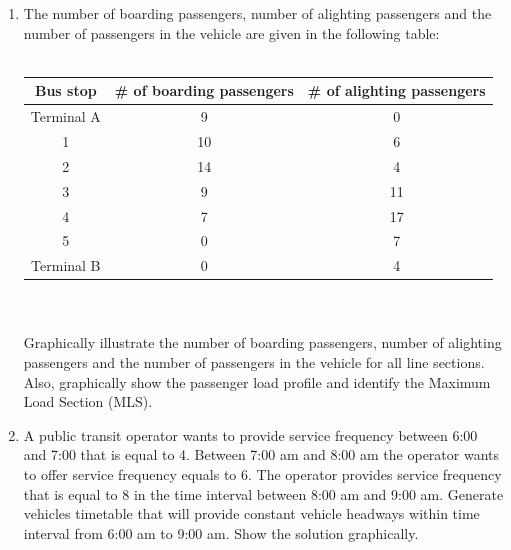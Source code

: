 \begin{enumerate}
\begin{center}
	\end{center}
	\item The number of boarding passengers, number of alighting passengers and the number of passengers in the vehicle are given in the following table:\\\\
	\begin{tabular}{c | c | c}
		\textbf{Bus stop} & \textbf{\# of boarding passengers} & \textbf{\# of alighting passengers} \\
		\hline
		Terminal A & 9 & 0\\
		1 & 10 & 6\\
		2 & 14 & 4\\
		3 & 9 & 11\\
		4 & 7 & 17\\
		5 & 0 & 7\\
		Terminal B & 0 & 4\\
		\hline
	\end{tabular}\\\\
	Graphically illustrate the number of boarding passengers, number of alighting passengers and the number of passengers in the vehicle for all line sections. Also, graphically show the passenger load profile and identify the Maximum Load Section (MLS).
	\item A public transit operator wants to provide service frequency between 6:00 and 7:00 that is equal to 4. Between 7:00 am and 8:00 am the operator wants to offer service frequency equals to 6. The operator provides service frequency that is equal to 8 in the time interval between 8:00 am and 9:00 am. Generate vehicles timetable that will provide constant vehicle headways within time interval from 6:00 am to 9:00 am. Show the solution graphically.
\end{enumerate}
